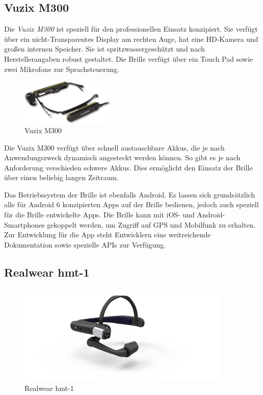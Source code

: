 \subsection{Vuzix M300}
\label{sec:Vuzix_M300}
Die \emph{Vuzix M300} ist speziell für den professionellen Einsatz konzipiert. Sie verfügt über ein nicht-Transparentes Display am rechten Auge, hat eine HD-Kamera und großen internen Speicher. Sie ist spritzwassergeschützt und nach Herstellerangaben robust gestaltet. Die Brille verfügt über ein Touch Pad sowie zwei Mikrofone zur Sprachsteuerung. 
%
\begin{figure}[htbp]
    \centering
    \includegraphics[width=0.4\textwidth]{data/bilder/m300-top.png}
    \caption{Vuzix M300 \cite{Vuzix2018}}
    \label{fig:Vuzix_M300}
\end{figure}
%

Die Vuzix M300 verfügt über schnell austauschbare Akkus, die je nach Anwendungszweck dynamisch angesteckt werden können. So gibt es je nach Anforderung verschieden schwere Akkus. Dies ermöglicht den Einsatz der Brille über einen beliebig langen Zeitraum.

Das Betriebssystem der Brille ist ebenfalls Android. Es lassen sich grundsätzlich alle für Android 6 konzipierten Apps auf der Brille bedienen, jedoch auch speziell für die Brille entwickelte Apps. Die Brille kann mit iOS- und Android-Smartphones gekoppelt werden, um Zugriff auf GPS und Mobilfunk zu erhalten. Zur Entwicklung für die App steht Entwicklern eine weitreichende Dokumentation sowie spezielle APIs zur Verfügung. \cite{Vuzix2018}
%
%
%
%
%
%
\subsection{Realwear hmt-1}
\label{sec:Realwear_hmt-1}
%
\begin{figure}[htbp]
    \centering
    \includegraphics[width=0.9\textwidth]{data/bilder/HMT_1.jpg}
    \caption{Realwear hmt-1 \cite{Wire2017}}
    \label{fig:hmt1}
\end{figure}
%

